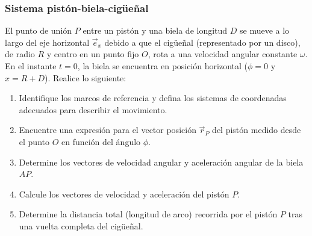 \subsubsection{Sistema pistón-biela-cigüeñal}

El punto de unión $P$ entre un pistón y una biela de longitud $D$ se mueve a lo largo del eje horizontal $\vec{e}_x$ debido a que el cigüeñal (representado por un disco), de radio $R$ y centro en un punto fijo $O$, rota a una velocidad angular constante $\omega$. En el instante $t=0$, la biela se encuentra en posición horizontal ($\phi = 0$ y $x = R + D$). Realice lo siguiente:

\begin{enumerate}
    \item Identifique los marcos de referencia y defina los sistemas de coordenadas adecuados para describir el movimiento.
    \item Encuentre una expresión para el vector posición $\vec{r}_P$ del pistón medido desde el punto $O$ en función del ángulo $\phi$.
    \item Determine los vectores de velocidad angular y aceleración angular de la biela $AP$.
    \item Calcule los vectores de velocidad y aceleración del pistón $P$.
    \item Determine la distancia total (longitud de arco) recorrida por el pistón $P$ tras una vuelta completa del cigüeñal.
\end{enumerate}

